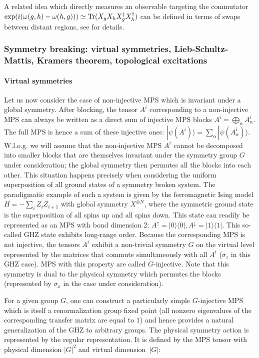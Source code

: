\documentclass[rmp,aps,reprint,superscriptaddress,nobalancelastpage]{revtex4-1}
\begin{document}
A related idea which directly measures an observable targeting the commutator $\exp(i(\omega(g,h)-\omega(h,g)))\simeq {\rm Tr}(X_gX_hX_g^\dagger X_h^\dagger)$ can be defined in terms of swaps between distant regions, see
\citet{haegeman:1d-spt-orderparameter} for details.

\subsubsection{Symmetry breaking: virtual symmetries, Lieb-Schultz-Mattis, Kramers theorem, topological excitations \label{sec3:SB}}
\paragraph{Virtual symmetries}
Let us now consider the case of non-injective MPS which is invariant under a global symmetry. After blocking, the tensor $A^i$ corresponding to a non-injective MPS can always be written as a direct sum of injective MPS blocks $A^i=\bigoplus_\alpha A^i_\alpha$. The full MPS is hence a sum of these injective ones: $|\psi(A^i)\rangle=\sum_\alpha|\psi(A^i_\alpha)\rangle$. W.l.o.g. we will assume that the non-injective MPS $A^i$ cannot be decomposed into smaller blocks that are themselves invariant under the symmetry group $G$ under consideration; the global symmetry then permutes all the blocks into each other.  This situation happens precisely when considering the uniform superposition of all ground states of a symmetry broken system.  The paradigmatic example of such a system is given by the ferromagnetic Ising model $H=-\sum_i Z_iZ_{i+1}$ with global symmetry $X^{\otimes N}$, where the symmetric ground state is the superposition of all spins up and all spins down. This state can readily be represented as an MPS with bond dimension 2: $A^{\uparrow}=|0\rangle\langle 0|,A^{\downarrow}=|1\rangle\langle 1|$. This so-called GHZ state exhibits long-range order. Because the corresponding MPS is not injective, the tensors $A^i$ exhibit a non-trivial symmetry $G$ on the virtual level represented by the matrices that commute simultaneously with all $A^i$ ($\sigma_z$ in this GHZ case).  MPS with this property are called $G$-injective. Note that this symmetry is dual to the physical symmetry which permutes the blocks (represented by $\sigma_x$ in the case under consideration).

For a given group $G$, one can construct a particularly simple $G$-injective MPS which is itself a renormalization group fixed point (all nonzero eigenvalues of the corresponding transfer matrix are equal to $1$) and hence provides a natural generalization of the GHZ to arbitrary groups. The physical symmetry action is represented by the regular representation.  It is defined by the MPS tensor with physical dimension $|G|^2$ and virtual dimension~$|G|$:
\end{document}
